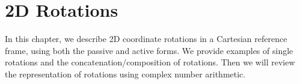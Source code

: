 %




\renewcommand{\chaptergraphicspath}{src/2Drotations/eps/}

\chapterimage{\noheaderimage}

\chapter{2D Rotations\label{chap:2Drotations}}
In this chapter, we describe 2D coordinate rotations in a Cartesian reference frame, using both the passive and active forms. We provide examples of single rotations and the concatenation/composition of rotations. Then we will review the representation of rotations using complex number arithmetic.


